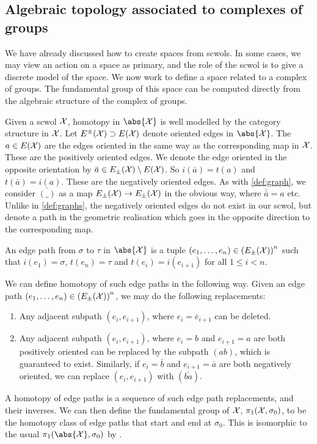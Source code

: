 \subsection{Algebraic topology associated to complexes of groups}
We have already discussed how to create spaces from scwols.
In some cases, we may view an action on a space as primary, and the role of the scwol is to give a discrete model of the space.
We now work to define a space related to a complex of groups.
The fundamental group of this space can be computed directly from the algebraic structure of the complex of groups.

Given a scwol $\mathcal{X}$, homotopy in $\abs{\calx}$ is well modelled by the category structure in $\mathcal{X}$.
Let  $E^{\pm}(\mathcal{X}) \supset E(\mathcal{X})$ denote oriented edges in $\abs{\calx}$.
The $a \in E(\mathcal{X})$ are the edges oriented in the same way as the corresponding map in $\mathcal{X}$.
These are the positively oriented edges.
We denote the edge oriented in the opposite orientation by $\bar{a} \in E_\pm(\mathcal{X})\setminus E(\mathcal{X})$.
So $i(\bar{a}) = t(a)$ and $t(\bar{a}) = i(a)$.
These are the negatively oriented edges.
As with \cref{def:graph}, we consider $\bar{(\_)}$ as a map $E_\pm(\mathcal{X}) \to E_\pm(\mathcal{X})$ in the obvious way, where  $\bar{\bar{a}}= a$ etc.
Unlike in \cref{def:graphs}, the negatively oriented edges do not exist in our scwol, but denote a path in the geometric realisation which goes in the opposite direction to the corresponding map.
\begin{definition}
	An edge path from $\sigma$ to  $\tau$ in $\abs{\calx}$ is a tuple $(e_1, \ldots, e_n) \in \left(E_\pm(\mathcal{X})\right)^n$ such that $i(e_1)=\sigma$,  $t(e_n)=\tau$ and  $t(e_i) = i(e_{i+1})$ for all  $1 \leq i < n$.
	\label{def:edge_path_in_scwol}
\end{definition}
We can define homotopy of such edge paths in the following way.
Given an edge path $(e_1, \ldots, e_n) \in \left(E_\pm(\mathcal{X})\right)^n$, we may do the following replacements:
\begin{enumerate}
	\item Any adjacent subpath $(e_i,e_{i+1})$, where $e_i=\bar{e}_{i+1}$ can be deleted.
	\item Any adjacent subpath $(e_i,e_{i+1})$, where $e_i = b$ and  $e_{i+1}=a$ are both positively oriented can be replaced by the subpath $(ab)$, which is guaranteed to exist.
	      Similarly, if $e_i = \bar{b}$ and  $e_{i+1}=\bar{a}$ are both negatively oriented, we can replace $(e_i,e_{i+1})$ with  $(\bar{ba})$.
\end{enumerate}
A homotopy of edge paths is a sequence of such edge path replacements, and their inverses.
We can then define the fundamental group of $\mathcal{X}$,  $\pi_1(\mathcal{X},\sigma_0)$, to be the homotopy class of edge paths that start and end at  $\sigma_0$.
This is isomorphic to the usual $\pi_1(\abs{\calx}, \sigma_0)$ by \cite[Corollary 4.12]{hatcher_algebraic_2001}.

